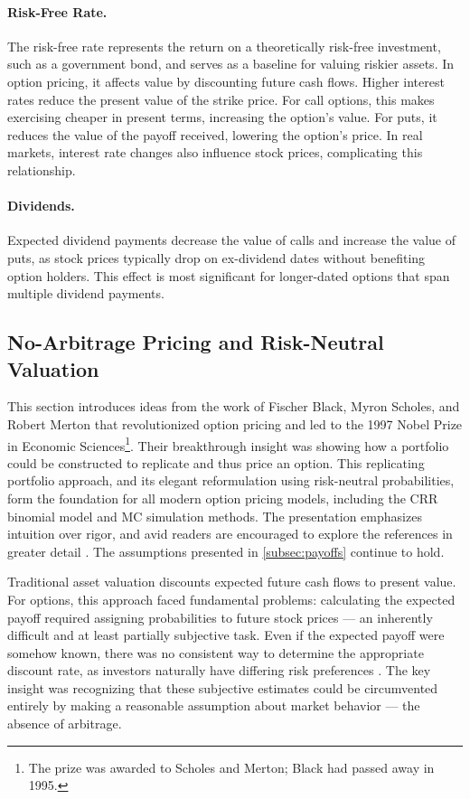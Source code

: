 \documentclass[english,12pt,a4paper,pdftex,sci,utf8]{aaltothesis}
\begin{document}
\paragraph{Risk-Free Rate.} The risk-free rate represents the return on a theoretically risk-free investment, such as a government bond, and serves as a baseline for valuing riskier assets. In option pricing, it affects value by discounting future cash flows. Higher interest rates reduce the present value of the strike price. For call options, this makes exercising cheaper in present terms, increasing the option’s value. For puts, it reduces the value of the payoff received, lowering the option’s price. In real markets, interest rate changes also influence stock prices, complicating this relationship.

\paragraph{Dividends.} Expected dividend payments decrease the value of calls and increase the value of puts, as stock prices typically drop on ex-dividend dates without benefiting option holders. This effect is most significant for longer-dated options that span multiple dividend payments.
\clearpage


\subsection{No-Arbitrage Pricing and Risk-Neutral Valuation}\label{sec:risk-neutral-theory}

This section introduces ideas from the work of Fischer Black, Myron Scholes, and Robert Merton that revolutionized option pricing and led to the 1997 Nobel Prize in Economic Sciences\footnote{The prize was awarded to Scholes and Merton; Black had passed away in 1995.}. Their breakthrough insight was showing how a portfolio could be constructed to replicate and thus price an option. This replicating portfolio approach, and its elegant reformulation using risk-neutral probabilities, form the foundation for all modern option pricing models, including the CRR binomial model and MC simulation methods. The presentation emphasizes intuition over rigor, and avid readers are encouraged to explore the references in greater detail \cite{hull2016options, gisiger2010risk, tham2001risk}. The assumptions presented in \cref{subsec:payoffs} continue to hold.

Traditional asset valuation discounts expected future cash flows to present value. For options, this approach faced fundamental problems: calculating the expected payoff required assigning probabilities to future stock prices --- an inherently difficult and at least partially subjective task. Even if the expected payoff were somehow known, there was no consistent way to determine the appropriate discount rate, as investors naturally have differing risk preferences \cite{nobel1997}. The key insight was recognizing that these subjective estimates could be circumvented entirely by making a reasonable assumption about market behavior --- the absence of arbitrage.
\end{document}
